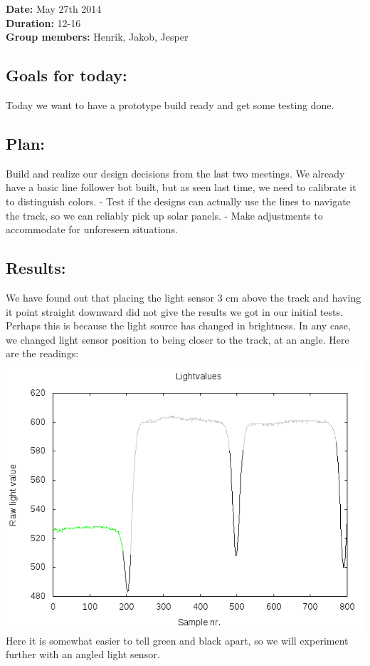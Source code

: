 \textbf{Date:} May 27th 2014\\
\textbf{Duration:} 12-16\\
\textbf{Group members:} Henrik, Jakob, Jesper

\subsection{Goals for today:}
Today we want to have a prototype build ready
and get some testing done.

\subsection{Plan:}
Build and realize our design decisions from the last
two meetings. We already have a basic line follower bot built, but as
seen last time, we need to calibrate it to distinguish colors. - Test if
the designs can actually use the lines to navigate the track, so we can
reliably pick up solar panels. - Make adjustments to accommodate for
unforeseen situations.

\subsection{Results:}
We have found out that placing the light sensor 3 cm
above the track and having it point straight downward did not give the
results we got in our initial tests. Perhaps this is because the light
source has changed in brightness. In any case, we changed light sensor
position to being closer to the track, at an angle. Here are the
readings:
\includegraphics[scale=0.5]{../experiments/1prototype/results/gnuplot/GridAccuracyTilt_color.png}\\
Here it is somewhat easier to tell green and black apart, so we will
experiment further with an angled light sensor.

